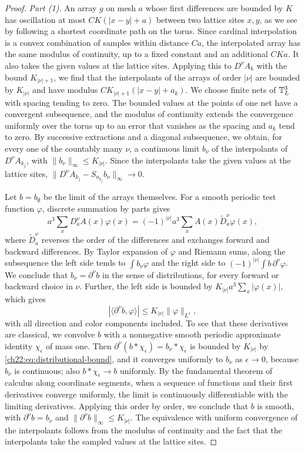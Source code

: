\begin{proof}
\emph{Part (1).} An array $g$ on mesh $a$ whose first differences are bounded by $K$ has oscillation at most $CK(|x-y|+a)$ between two lattice sites $x,y$, as we see by following a shortest coordinate path on the torus. Since cardinal interpolation is a convex combination of samples within distance $Ca$, the interpolated array has the same modulus of continuity, up to a fixed constant and an additional $CKa$. It also takes the given values at the lattice sites. Applying this to $D^\nu A_k$ with the bound $K_{|\nu|+1}$, we find that the interpolants of the arrays of order $|\nu|$ are bounded by $K_{|\nu|}$ and have modulus $CK_{|\nu|+1}(|x-y|+a_k)$. We choose finite nets of $\mathbb T_L^3$ with spacing tending to zero. The bounded values at the points of one net have a convergent subsequence, and the modulus of continuity extends the convergence uniformly over the torus up to an error that vanishes as the spacing and $a_k$ tend to zero. By successive extractions and a diagonal subsequence, we obtain, for every one of the countably many $\nu$, a continuous limit $b_\nu$ of the interpolants of $D^\nu A_{k_j}$, with $\|b_\nu\|_\infty\le K_{|\nu|}$. Since the interpolants take the given values at the lattice sites, $\|D^\nu A_{k_j}-S_{a_{k_j}}b_\nu\|_\infty\to0$.

Let $b=b_\emptyset$ be the limit of the arrays themselves. For a smooth periodic test function $\varphi$, discrete summation by parts gives
\[
 a^3\sum_xD_a^\nu A(x)\varphi(x)=(-1)^{|\nu|}a^3\sum_xA(x)\widetilde D_a^\nu\varphi(x),
\]
where $\widetilde D_a^\nu$ reverses the order of the differences and exchanges forward and backward differences. By Taylor expansion of $\varphi$ and Riemann sums, along the subsequence the left side tends to $\int b_\nu\varphi$ and the right side to $(-1)^{|\nu|}\int b\,\partial^\nu\varphi$. We conclude that $b_\nu=\partial^\nu b$ in the sense of distributions, for every forward or backward choice in $\nu$. Further, the left side is bounded by $K_{|\nu|}a^3\sum_x|\varphi(x)|$, which gives
\begin{equation}\label{ch22:eq:distributional-bound}
 |\langle\partial^\nu b,\varphi\rangle|\le K_{|\nu|}\|\varphi\|_{L^1},
\end{equation}
with all direction and color components included. To see that these derivatives are classical, we convolve $b$ with a nonnegative smooth periodic approximate identity $\chi_\epsilon$ of mass one. Then $\partial^\nu(b*\chi_\epsilon)=b_\nu*\chi_\epsilon$ is bounded by $K_{|\nu|}$ by \eqref{ch22:eq:distributional-bound}, and it converges uniformly to $b_\nu$ as $\epsilon\to0$, because $b_\nu$ is continuous; also $b*\chi_\epsilon\to b$ uniformly. By the fundamental theorem of calculus along coordinate segments, when a sequence of functions and their first derivatives converge uniformly, the limit is continuously differentiable with the limiting derivatives. Applying this order by order, we conclude that $b$ is smooth, with $\partial^\nu b=b_\nu$ and $\|\partial^\nu b\|_\infty\le K_{|\nu|}$. The equivalence with uniform convergence of the interpolants follows from the modulus of continuity and the fact that the interpolants take the sampled values at the lattice sites.


\end{proof}
